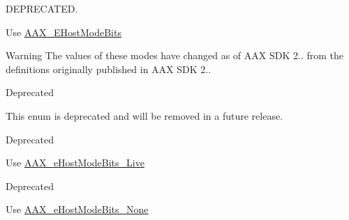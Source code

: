 D\+E\+P\+R\+E\+C\+A\+T\+E\+D. 

Use \hyperlink{a00206_aa3c8056a6ce601cc3367cb7d4478e9da}{A\+A\+X\+\_\+\+E\+Host\+Mode\+Bits}

\begin{DoxyWarning}{Warning}
The values of these modes have changed as of A\+A\+X S\+D\+K 2.. from the definitions originally published in A\+A\+X S\+D\+K 2..
\end{DoxyWarning}
\begin{DoxyRefDesc}{Deprecated}
\item[\hyperlink{a00386__deprecated000005}{Deprecated}]This enum is deprecated and will be removed in a future release. \end{DoxyRefDesc}
\begin{Desc}
\item[Enumerator]\par
\begin{description}
\item[{\em 
\hypertarget{a00206_af7d77416967955e258539694870f395aabcdafa25dc3d69fad51b53e4747eed0c}{}A\+A\+X\+\_\+e\+Host\+Mode\+\_\+\+Show\label{a00206_af7d77416967955e258539694870f395aabcdafa25dc3d69fad51b53e4747eed0c}
}]\begin{DoxyRefDesc}{Deprecated}
\item[\hyperlink{a00386__deprecated000009}{Deprecated}]Use \hyperlink{a00206_aa3c8056a6ce601cc3367cb7d4478e9daa83555a8ed532fa43f3583af95ca3d39b}{A\+A\+X\+\_\+e\+Host\+Mode\+Bits\+\_\+\+Live} \end{DoxyRefDesc}
\item[{\em 
\hypertarget{a00206_af7d77416967955e258539694870f395aa24a5c6d96b5ae069266976193f07cb6f}{}A\+A\+X\+\_\+e\+Host\+Mode\+\_\+\+Config\label{a00206_af7d77416967955e258539694870f395aa24a5c6d96b5ae069266976193f07cb6f}
}]\begin{DoxyRefDesc}{Deprecated}
\item[\hyperlink{a00386__deprecated000010}{Deprecated}]Use \hyperlink{a00206_aa3c8056a6ce601cc3367cb7d4478e9daaa72ba643264dbc37d627b91534db7c1a}{A\+A\+X\+\_\+e\+Host\+Mode\+Bits\+\_\+\+None} \end{DoxyRefDesc}
\end{description}
\end{Desc}
\hypertarget{a00206_a9f1ef2cb64daf30eaf145dfbb8cd0d00}{}
